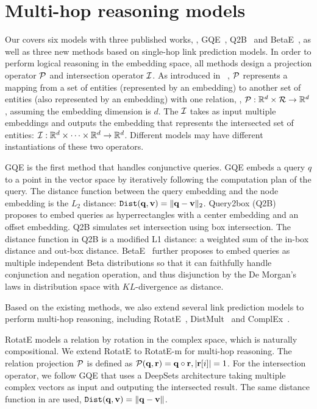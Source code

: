 \section{Multi-hop reasoning models}\label{appendix:models}

Our \modelshort covers six models with three published works, \ie,  GQE~\cite{hamilton2018embedding}, Q2B~\cite{ren2020query2box} and BetaE~\cite{ren2020beta}, as well as three new methods based on single-hop link prediction models. 
% 
In order to perform logical reasoning in the embedding space, all methods design a projection operator $\mathcal{P}$ and intersection operator $\mathcal{I}$. As introduced in ~, $\mathcal{P}$ represents a mapping from a set of entities (represented by an embedding) to another set of entities (also represented by an embedding) with one relation, \ie, $\mathcal{P}: \mathbb{R}^d\times\mathcal{R}\to\mathbb{R}^d$, assuming the embedding dimension is $d$. The $\mathcal{I}$ takes as input multiple embeddings and outputs the embedding that represents the intersected set of entities: $\mathcal{I}: \mathbb{R}^d\times\dots\times\mathbb{R}^d\to\mathbb{R}^d$. Different models may have different instantiations of these two operators.

GQE \citep{hamilton2018embedding} is the first method that handles conjunctive queries. GQE embeds a query $q$ to a point in the vector space by iteratively following the computation plan of the query. 
%  
The distance function between the query embedding and the node embedding is the $L_2$ distance: $\texttt{Dist}(\mathbf{q},\mathbf{v})=\|\mathbf{q}-\mathbf{v}\|_2$. 
% 
Query2box (Q2B)~\cite{ren2020query2box} proposes to embed queries as hyperrectangles with a center embedding and an offset embedding. Q2B simulates set intersection using box intersection. The distance function in Q2B is a modified L1 distance: a weighted sum of the in-box distance and out-box distance.
BetaE~\cite{ren2020beta} further proposes to embed queries as multiple independent Beta distributions so that it can faithfully handle conjunction and negation operation, and thus disjunction by the De Morgan's laws in distribution space with $KL$-divergence as distance. 


Based on the existing methods, we also extend several link prediction models to perform multi-hop reasoning, including RotatE~\cite{sun2019rotate}, DistMult~\cite{yang2014embedding} and ComplEx~\cite{trouillon2016complex}. 

RotatE models a relation by rotation in the complex space, which is naturally compositional. We extend RotatE to RotatE-m for multi-hop reasoning. The relation projection $\mathcal{P}$ is defined as
% 
$\mathcal{P}(\mathbf{q},\mathbf{r})=\mathbf{q}\circ\mathbf{r}, |\mathbf{r}[i]|=1$. For the intersection operator, we follow GQE that uses a DeepSets architecture taking multiple complex vectors as input and outputing the intersected result. 
% 
The same distance function in \citet{sun2019rotate} are used, $\texttt{Dist}(\mathbf{q},\mathbf{v})=\|\mathbf{q}-\mathbf{v}\|$.


